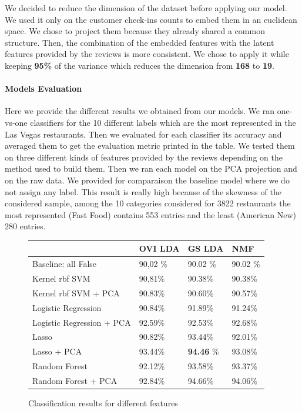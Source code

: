 \documentclass[twoside]{article}
\begin{document}
\begin{multicols}{2}
We decided to reduce the dimension of the dataset before applying our model. We used it only on the customer check-ins counts to embed them in an euclidean space. We chose to project them because they already shared a common structure. Then, the combination of the embedded features with the latent features provided by the reviews is more consistent. We chose to apply it while keeping \textbf{95\%} of the variance which reduces the dimension from \textbf{168} to \textbf{19}.

\paragraph{Models Evaluation}

Here we provide the different results we obtained from our models. We ran one-vs-one classifiers for the 10 different labels which are the most represented in the Las Vegas restaurants. Then we evaluated for each classifier its accuracy and averaged them to get the evaluation metric printed in the table. We tested them on three different kinds of features provided by the reviews depending on the method used to build them. Then we ran each model on the PCA projection and on the raw data. We provided for comparaison the baseline model where we do not assign any label. This result is really high because of the skewness of the considered sample, among the 10 categories considered for 3822 restaurants the most represented (Fast Food) contains 553 entries and the least (American New) 280 entries.

\begin{figure}[H]
\begin{center}
    \begin{tabular}{| l | l | l | l |}
    \hline
    & OVI LDA & GS LDA & NMF \\ \hline
    Baseline: all False & 90,02 \% &  90.02 \% &  90.02 \% \\ \hline
    Kernel rbf SVM & 90,81\% &  90.38\% &  90.38\% \\ \hline
    Kernel rbf SVM + PCA & 90.83\% &  90.60\% &  90.57\% \\ \hline
    Logistic Regression & 90.84\% &  91.89\%  &  91.24\%\\ \hline
    Logistic Regression + PCA & 92.59\% &  92.53\% &  92.68\% \\ \hline
    Lasso & 90.82\% &  93.44\% &  92.01\% \\ \hline
	Lasso + PCA & 93.44\%  &  \textbf{94.46} \%  &  93.08\% \\ \hline
    Random Forest & 92.12\% &  93.58\% &  93.37\% \\ \hline
    Random Forest + PCA & 92.84\% &  94.66\% &  94.06\% \\ \hline
    \end{tabular}
\end{center}
\caption{Classification results for different features}
\end{figure}


\end{multicols}
\end{document}
